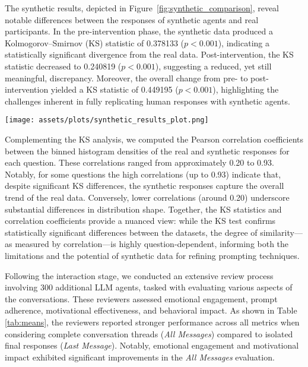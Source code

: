 \documentclass[sigconf, nonacm]{acmart}
\begin{document}
The synthetic results, depicted in Figure~\ref{fig:synthetic_comparison}, reveal notable differences between the responses of synthetic agents and real participants. In the pre-intervention phase, the synthetic data produced a Kolmogorov–Smirnov (KS) statistic of 0.378133 ($p < 0.001$), indicating a statistically significant divergence from the real data. Post-intervention, the KS statistic decreased to 0.240819 ($p < 0.001$), suggesting a reduced, yet still meaningful, discrepancy. Moreover, the overall change from pre- to post-intervention yielded a KS statistic of 0.449195 ($p < 0.001$), highlighting the challenges inherent in fully replicating human responses with synthetic agents.

\begin{figure*}[ht]
    \centering
    \texttt{[image: assets/plots/synthetic\_results\_plot.png]}
    \caption{Comparison of synthetic and real participant results for the dependent variable "Sustainable Consumption".}
    \label{fig:synthetic_comparison}
\end{figure*}

Complementing the KS analysis, we computed the Pearson correlation coefficients between the binned histogram densities of the real and synthetic responses for each question. These correlations ranged from approximately 0.20 to 0.93. Notably, for some questions the high correlations (up to 0.93) indicate that, despite significant KS differences, the synthetic responses capture the overall trend of the real data. Conversely, lower correlations (around 0.20) underscore substantial differences in distribution shape. Together, the KS statistics and correlation coefficients provide a nuanced view: while the KS test confirms statistically significant differences between the datasets, the degree of similarity—as measured by correlation—is highly question-dependent, informing both the limitations and the potential of synthetic data for refining prompting techniques.

Following the interaction stage, we conducted an extensive review process involving 300 additional LLM agents, tasked with evaluating various aspects of the conversations. These reviewers assessed emotional engagement, prompt adherence, motivational effectiveness, and behavioral impact. As shown in Table \ref{tab:means}, the reviewers reported stronger performance across all metrics when considering complete conversation threads (\textit{All Messages}) compared to isolated final responses (\textit{Last Message}). Notably, emotional engagement and motivational impact exhibited significant improvements in the \textit{All Messages} evaluation.
\end{document}
